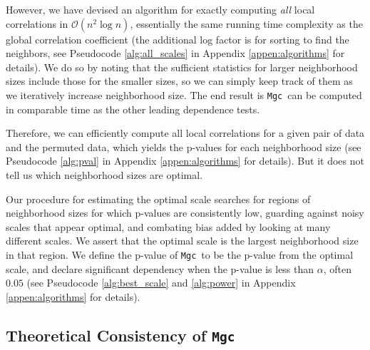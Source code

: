 \documentclass[11pt]{article}
\providecommand{\sct}[1]{{\sc \texttt{#1}}}
\providecommand{\mc}[1]{\mathcal{#1}}
\newcommand{\G}{C}
\newcommand{\Mgc}{\sct{Mgc}}
\begin{document}
However, we have devised an algorithm for exactly computing \emph{all} local correlations in $\mc{O}(n^2 \log n)$, essentially the same running time complexity as the global correlation coefficient (the additional log factor is for sorting to find the neighbors, see Pseudocode \ref{alg:all_scales} in Appendix \ref{appen:algorithms} for details). We do so by noting that the sufficient statistics for larger neighborhood sizes include those for the smaller sizes, so we can simply keep track of them as we iteratively increase neighborhood size. The end result is \Mgc~can be computed in comparable time as the other leading dependence tests.

Therefore, we can efficiently compute all local correlations for a given pair of data and the permuted data, which yields the p-values for each neighborhood size (see Pseudocode \ref{alg:pval} in Appendix \ref{appen:algorithms} for details). But it does not tell us which neighborhood sizes are optimal.

Our procedure for estimating the optimal scale searches for regions of neighborhood sizes for which p-values are consistently low, guarding against noisy scales that appear optimal, and combating bias added by looking at many different scales.
%
We assert that the optimal scale is the largest neighborhood size in that region.
We define the p-value of \Mgc~to be the p-value from the optimal scale, and declare significant dependency when the p-value is less than $\alpha$, often $0.05$ (see Pseudocode \ref{alg:best_scale} and \ref{alg:power} in Appendix \ref{appen:algorithms} for details).

\subsection*{Theoretical Consistency of \Mgc}
\label{s:theory}
\end{document}
